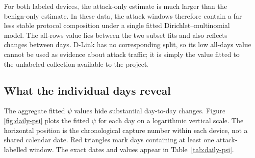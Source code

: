 \documentclass[11pt]{article}
\begin{document}
For both labeled devices, the attack-only estimate is much larger than the
benign-only estimate. In these data, the attack windows therefore contain a
far less stable protocol composition under a single fitted
Dirichlet--multinomial model. The all-rows value lies between the two subset
fits and also reflects changes between days. D-Link has no corresponding
split, so its low all-days value cannot be used as evidence about attack
traffic; it is simply the value fitted to the unlabeled collection available
to the project.

\subsection{What the individual days reveal}

The aggregate fitted \(\psi\) values hide substantial day-to-day changes. Figure
\ref{fig:daily-psi} plots the fitted \(\psi\) for each day on a logarithmic
vertical scale. The
horizontal position is the chronological capture number within each device,
not a shared calendar date. Red triangles mark days containing at least one
attack-labelled window. The exact dates and values appear in
Table~\ref{tab:daily-psi}.
\end{document}
